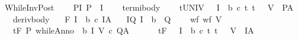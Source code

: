 \begin{isabellebody}
%
\isadelimproof
\isanewline
%
\endisadelimproof
\isanewline
\isanewline
\isanewline
{}\isamarkupfalse%
\ WhileInvPost{\isacharcolon}\ \isanewline
\ \ \ P{\isacharunderscore}I{\isacharcolon}\ {\isachardoublequoteopen}P\ {\isasymsubseteq}\ I{\isachardoublequoteclose}\ \isanewline
\ \ \ termi{\isacharunderscore}body{\isacharcolon}\ \isanewline
\ \ {\isachardoublequoteopen}{\isasymforall}{\isasymsigma}{\isachardot}\ {\isasymGamma}{\isacharcomma}{\isasymTheta}{\isasymturnstile}\isactrlsub t\isactrlbsub {\isacharslash}UNIV\isactrlesub \ {\isacharparenleft}{\isacharbraceleft}{\isasymsigma}{\isacharbraceright}\ {\isasyminter}\ I\ {\isasyminter}\ b{\isacharparenright}\ c\ {\isacharparenleft}{\isacharbraceleft}t{\isachardot}\ {\isacharparenleft}t{\isacharcomma}\ {\isasymsigma}{\isacharparenright}\ {\isasymin}\ V{\isacharbraceright}\ {\isasyminter}\ P{\isacharparenright}{\isacharcomma}A{\isachardoublequoteclose}\isanewline
\ \ \ deriv{\isacharunderscore}body{\isacharcolon}\ \isanewline
\ \ {\isachardoublequoteopen}{\isasymGamma}{\isacharcomma}{\isasymTheta}{\isasymturnstile}\isactrlbsub {\isacharslash}F\isactrlesub \ {\isacharparenleft}I\ {\isasyminter}\ b{\isacharparenright}\ c\ I{\isacharcomma}A{\isachardoublequoteclose}\isanewline
\ \ \ I{\isacharunderscore}Q{\isacharcolon}\ {\isachardoublequoteopen}I\ {\isasyminter}\ {\isacharminus}b\ {\isasymsubseteq}\ Q{\isachardoublequoteclose}\ \isanewline
\ \ \ wf{\isacharcolon}\ {\isachardoublequoteopen}wf\ V{\isachardoublequoteclose}\isanewline
\ \ \ {\isachardoublequoteopen}{\isasymGamma}{\isacharcomma}{\isasymTheta}{\isasymturnstile}\isactrlsub t\isactrlbsub {\isacharslash}F\isactrlesub \ P\ {\isacharparenleft}whileAnno\ \ b\ I\ V\ c{\isacharparenright}\ Q{\isacharcomma}A{\isachardoublequoteclose}\isanewline
%
\isadelimproof
%
\endisadelimproof
%
\isatagproof
{}\isamarkupfalse%
\ {\isacharminus}\isanewline
\ \ \isamarkupfalse%
\ {\isachardoublequoteopen}{\isasymforall}{\isasymsigma}{\isachardot}\ {\isasymGamma}{\isacharcomma}{\isasymTheta}{\isasymturnstile}\isactrlsub t\isactrlbsub {\isacharslash}F\isactrlesub \ {\isacharparenleft}{\isacharbraceleft}{\isasymsigma}{\isacharbraceright}\ {\isasyminter}\ I\ {\isasyminter}\ b{\isacharparenright}\ c\ {\isacharparenleft}{\isacharbraceleft}t{\isachardot}\ {\isacharparenleft}t{\isacharcomma}\ {\isasymsigma}{\isacharparenright}\ {\isasymin}\ V{\isacharbraceright}\ {\isasyminter}\ I{\isacharparenright}{\isacharcomma}A{\isachardoublequoteclose}\isanewline

\end{isabellebody}
